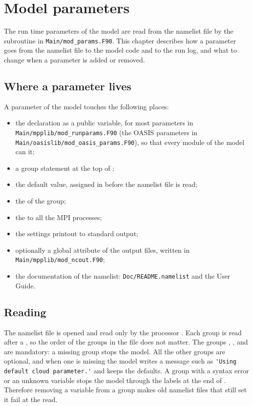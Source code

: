 \chapter{Model parameters}

The run time parameters of the model are read from the namelist file by
the subroutine  in \verb=Main/mod_params.F90=. This chapter
describes how a parameter goes from the namelist file to the model code and
to the run log, and what to change when a parameter is added or removed.

\section{Where a parameter lives}

A parameter of the model touches the following places:
\begin{itemize}
  \item the declaration as a public variable, for most parameters in
        \verb=Main/mpplib/mod_runparams.F90= (the OASIS parameters in
        \verb=Main/oasislib/mod_oasis_params.F90=), so that every module
        of the model can  it;
  \item a  group statement at the top of ;
  \item the default value, assigned in  before the namelist
        file is read;
  \item the  of the group;
  \item the  to all the MPI processes;
  \item the settings printout to standard output;
  \item optionally a global attribute of the output files, written in
        \verb=Main/mpplib/mod_ncout.F90=;
  \item the documentation of the namelist: \verb=Doc/README.namelist= and
        the User Guide.
\end{itemize}

\section{Reading}

The namelist file is opened and read only by the processor .
Each group is read after a , so the order of the groups in the
file does not matter. The groups , ,
 and  are mandatory: a missing group stops
the model. All the other groups are optional, and when one is missing the
model writes a message such as \verb='Using default cloud parameter.'= and
keeps the defaults. A group with a syntax error or an unknown variable stops
the model through the  labels at the end of .
Therefore removing a variable from a group makes old namelist files that
still set it fail at the read.

